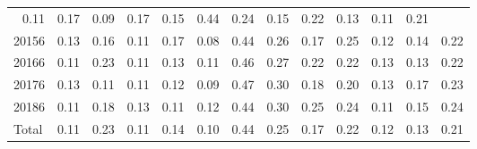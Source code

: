 \begin{table}[!h]
\begin{tabular}{lllllllllllll}
  \multicolumn{1}{|r}{0.11} &
  \multicolumn{1}{r}{0.17} &
  \multicolumn{1}{r}{0.09} &
  \multicolumn{1}{r}{0.17} &
  \multicolumn{1}{r}{0.15} &
  \multicolumn{1}{r}{0.44} &
  \multicolumn{1}{r}{0.24} &
  \multicolumn{1}{r}{0.15} &
  \multicolumn{1}{r}{0.22} &
  \multicolumn{1}{r}{0.13} &
  \multicolumn{1}{r}{0.11} &
  \multicolumn{1}{r}{0.21} \\
\multicolumn{1}{l}{\hspace{1em}20156} &
  \multicolumn{1}{|r}{0.13} &
  \multicolumn{1}{r}{0.16} &
  \multicolumn{1}{r}{0.11} &
  \multicolumn{1}{r}{0.17} &
  \multicolumn{1}{r}{0.08} &
  \multicolumn{1}{r}{0.44} &
  \multicolumn{1}{r}{0.26} &
  \multicolumn{1}{r}{0.17} &
  \multicolumn{1}{r}{0.25} &
  \multicolumn{1}{r}{0.12} &
  \multicolumn{1}{r}{0.14} &
  \multicolumn{1}{r}{0.22} \\
\multicolumn{1}{l}{\hspace{1em}20166} &
  \multicolumn{1}{|r}{0.11} &
  \multicolumn{1}{r}{0.23} &
  \multicolumn{1}{r}{0.11} &
  \multicolumn{1}{r}{0.13} &
  \multicolumn{1}{r}{0.11} &
  \multicolumn{1}{r}{0.46} &
  \multicolumn{1}{r}{0.27} &
  \multicolumn{1}{r}{0.22} &
  \multicolumn{1}{r}{0.22} &
  \multicolumn{1}{r}{0.13} &
  \multicolumn{1}{r}{0.13} &
  \multicolumn{1}{r}{0.22} \\
\multicolumn{1}{l}{\hspace{1em}20176} &
  \multicolumn{1}{|r}{0.13} &
  \multicolumn{1}{r}{0.11} &
  \multicolumn{1}{r}{0.11} &
  \multicolumn{1}{r}{0.12} &
  \multicolumn{1}{r}{0.09} &
  \multicolumn{1}{r}{0.47} &
  \multicolumn{1}{r}{0.30} &
  \multicolumn{1}{r}{0.18} &
  \multicolumn{1}{r}{0.20} &
  \multicolumn{1}{r}{0.13} &
  \multicolumn{1}{r}{0.17} &
  \multicolumn{1}{r}{0.23} \\
\multicolumn{1}{l}{\hspace{1em}20186} &
  \multicolumn{1}{|r}{0.11} &
  \multicolumn{1}{r}{0.18} &
  \multicolumn{1}{r}{0.13} &
  \multicolumn{1}{r}{0.11} &
  \multicolumn{1}{r}{0.12} &
  \multicolumn{1}{r}{0.44} &
  \multicolumn{1}{r}{0.30} &
  \multicolumn{1}{r}{0.25} &
  \multicolumn{1}{r}{0.24} &
  \multicolumn{1}{r}{0.11} &
  \multicolumn{1}{r}{0.15} &
  \multicolumn{1}{r}{0.24} \\
\multicolumn{1}{l}{\hspace{1em}Total} &
  \multicolumn{1}{|r}{0.11} &
  \multicolumn{1}{r}{0.23} &
  \multicolumn{1}{r}{0.11} &
  \multicolumn{1}{r}{0.14} &
  \multicolumn{1}{r}{0.10} &
  \multicolumn{1}{r}{0.44} &
  \multicolumn{1}{r}{0.25} &
  \multicolumn{1}{r}{0.17} &
  \multicolumn{1}{r}{0.22} &
  \multicolumn{1}{r}{0.12} &
  \multicolumn{1}{r}{0.13} &
  \multicolumn{1}{r}{0.21} \\
\cline{1-13}
\end{tabular}
\end{table}
